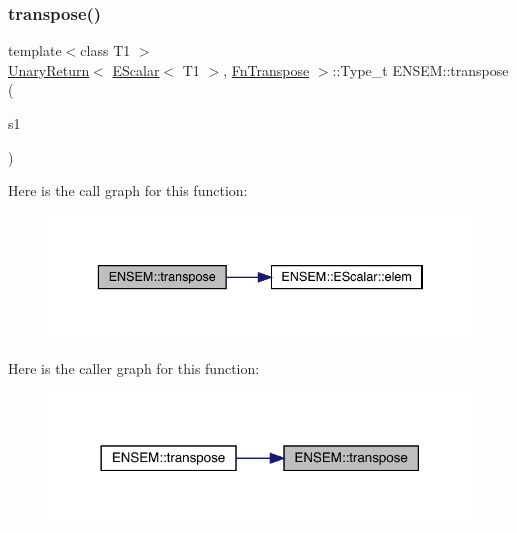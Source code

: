\subsubsection{\texorpdfstring{transpose()}{transpose()}}
{\footnotesize\ttfamily template$<$class T1 $>$ \\
\mbox{\hyperlink{structENSEM_1_1UnaryReturn}{Unary\+Return}}$<$ \mbox{\hyperlink{classENSEM_1_1EScalar}{E\+Scalar}}$<$ T1 $>$, \mbox{\hyperlink{structENSEM_1_1FnTranspose}{Fn\+Transpose}} $>$\+::Type\+\_\+t E\+N\+S\+E\+M\+::transpose (\begin{DoxyParamCaption}\item[{const \mbox{\hyperlink{classENSEM_1_1EScalar}{E\+Scalar}}$<$ T1 $>$ \&}]{s1 }\end{DoxyParamCaption})\hspace{0.3cm}{\ttfamily [inline]}}

Here is the call graph for this function\+:
\nopagebreak
\begin{figure}[H]
\begin{center}
\leavevmode
\includegraphics[width=336pt]{d4/dca/group__escalar_ga5b02d7d8a00b851a2452fb03861a9401_cgraph}
\end{center}
\end{figure}
Here is the caller graph for this function\+:
\nopagebreak
\begin{figure}[H]
\begin{center}
\leavevmode
\includegraphics[width=318pt]{d4/dca/group__escalar_ga5b02d7d8a00b851a2452fb03861a9401_icgraph}
\end{center}
\end{figure}
\mbox{\label{group__escalar_ga1b68bb6fff59089642921a334fde6ef5}} 
